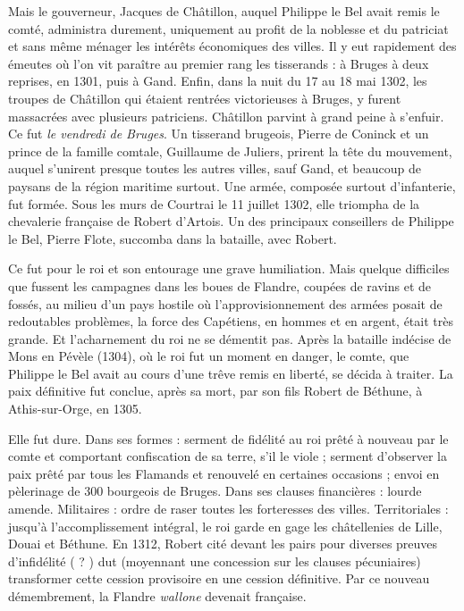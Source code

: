 \documentclass[french,twoside]{book} %
\begin{document}
Mais le gouverneur, Jacques de Châtillon, auquel Philippe le Bel avait remis le comté, administra durement, uniquement au profit de la noblesse et du patriciat et sans même ménager les intérêts économiques des villes. Il y eut rapidement des émeutes où l’on vit paraître au premier rang les tisserands : à Bruges à deux reprises, en 1301, puis à Gand. Enfin, dans la nuit du 17 au 18 mai 1302, les troupes de Châtillon qui étaient rentrées victorieuses à Bruges, y furent massacrées avec plusieurs patriciens. Châtillon parvint à grand peine à s’enfuir. Ce fut \emph{le vendredi de Bruges}. Un tisserand brugeois, Pierre de Coninck et un prince de la famille comtale, Guillaume de Juliers, prirent la tête du mouvement, auquel s’unirent presque toutes les autres villes, sauf Gand, et beaucoup de paysans de la région maritime surtout. Une armée, composée surtout d’infanterie, fut formée. Sous les murs de Courtrai le 11 juillet 1302, elle triompha de la chevalerie française de Robert d’Artois. Un des principaux conseillers de Philippe le Bel, Pierre Flote, succomba dans la bataille, avec Robert.\par
Ce fut pour le roi et son entourage une grave humiliation. Mais quelque difficiles que fussent les campagnes dans les boues de Flandre, coupées de ravins et de fossés, au milieu d’un pays hostile où l’approvisionnement des armées posait de redoutables problèmes, la force des Capétiens, en hommes et en argent, était très grande. Et l’acharnement du roi ne se démentit pas. Après la bataille indécise de Mons en Pévèle (1304), où le roi fut un moment en danger, le comte, que Philippe le Bel avait au cours d’une trêve remis en liberté, se décida à traiter. La paix définitive fut conclue, après sa mort, par son fils Robert de Béthune, à Athis-sur-Orge, en 1305.\par
Elle fut dure. Dans ses formes : serment de fidélité au roi prêté à nouveau par le comte et comportant confiscation de sa terre, s’il le viole ; serment d’observer la paix prêté par tous les Flamands et renouvelé en certaines occasions ; envoi en pèlerinage de 300 bourgeois de Bruges. Dans ses clauses financières : lourde amende. Militaires : ordre de raser toutes les forteresses des villes. Territoriales : jusqu’à l’accomplissement intégral, le roi garde en gage les châtellenies de Lille, Douai et Béthune. En 1312, Robert cité devant les pairs pour diverses preuves d’infidélité ( ? ) dut (moyennant une concession sur les clauses pécuniaires) transformer cette cession provisoire en une cession définitive. Par ce nouveau démembrement, la Flandre \emph{wallone} devenait française.\par
\end{document}
